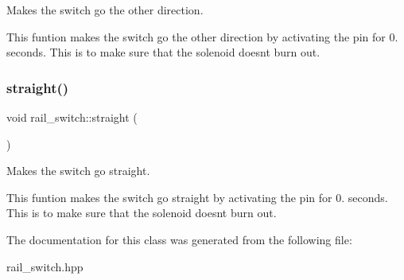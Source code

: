 Makes the switch go the other direction. 

This funtion makes the switch go the other direction by activating the pin for 0. seconds. This is to make sure that the solenoid doesn\textquotesingle{}t burn out. \mbox{\label{classrail__switch_af6eb3f3e9dfe74d59d51d7b1d15a0e36}} 
\subsubsection{\texorpdfstring{straight()}{straight()}}
{\footnotesize\ttfamily void rail\+\_\+switch\+::straight (\begin{DoxyParamCaption}{ }\end{DoxyParamCaption})\hspace{0.3cm}{\ttfamily [inline]}}



Makes the switch go straight. 

This funtion makes the switch go straight by activating the pin for 0. seconds. This is to make sure that the solenoid doesn\textquotesingle{}t burn out. 

The documentation for this class was generated from the following file\+:\begin{DoxyCompactItemize}
\item 
rail\+\_\+switch.\+hpp\end{DoxyCompactItemize}
